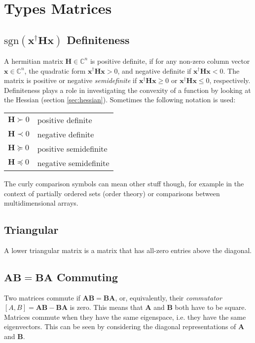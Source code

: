 \section{Types Matrices}

\subsection{$\mathrm{sgn}\left(\mathbf{x}^{\dagger}\mathbf{H}\mathbf{x}\right)$ Definiteness}
\label{sec:definiteness}

A hermitian matrix $\mathbf{H}\in\mathbb{C}^n$ is positive definite, if for any non-zero column vector $\mathbf{x}\in\mathbb{C}^n$, the quadratic form $\mathbf{x}^{\dagger}\mathbf{H}\mathbf{x} > 0$, and negative definite if $\mathbf{x}^{\dagger}\mathbf{H}\mathbf{x} < 0$. The matrix is positive or negative \textit{semidefinite} if  $\mathbf{x}^{\dagger}\mathbf{H}\mathbf{x} \geq 0$ or $\mathbf{x}^{\dagger}\mathbf{H}\mathbf{x} \leq 0$, respectively. Definiteness plays a role in investigating the convexity of a function by looking at the Hessian (section \ref{sec:hessian}). Sometimes the following notation is used:

\begin{tabular}{ll}
$\mathbf{H} \succ 0$ & positive definite\\
$\mathbf{H} \prec 0$ & negative definite\\
$\mathbf{H} \succeq 0$ & positive semidefinite\\
$\mathbf{H} \preceq 0$ & negative semidefinite
\centering
\end{tabular}

The curly comparison symbols can mean other stuff though, for example in the context of partially ordered sets (order theory) or comparisons between multidimensional arrays.

\subsection{Triangular}
A lower triangular matrix is a matrix that has all-zero entries above the diagonal.

\subsection{$\mathbf{AB}=\mathbf{BA}$ Commuting}
Two matrices commute if $\mathbf{AB}=\mathbf{BA}$, or, equivalently, their \textit{commutator} $[A,B] = \mathbf{AB}-\mathbf{BA}$ is zero. This means that $\mathbf{A}$ and $\mathbf{B}$ both have to be square. Matrices commute when they have the same eigenspace, i.e. they have the same eigenvectors. This can be seen by considering the diagonal representations of $\mathbf{A}$ and $\mathbf{B}$.

